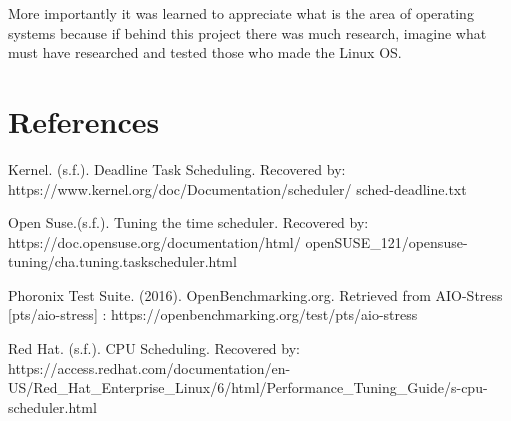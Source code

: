 \documentclass[a4paper]{article}
\begin{document}
More importantly it was learned to appreciate what is the area of operating systems because if behind this project there was much research, imagine what must have researched and tested those who made the Linux OS.

\section {References}

	Kernel. (s.f.). Deadline Task Scheduling. Recovered by: https://www.kernel.org/doc/Documentation/scheduler/
    sched-deadline.txt

\setlength{\parskip}{3mm}

Open Suse.(s.f.). Tuning the time scheduler. Recovered by: https://doc.opensuse.org/documentation/html/
openSUSE\_121/opensuse-tuning/cha.tuning.taskscheduler.html

Phoronix Test Suite. (2016). OpenBenchmarking.org. Retrieved from AIO-Stress [pts/aio-stress] : https://openbenchmarking.org/test/pts/aio-stress

Red Hat. (s.f.). CPU Scheduling. Recovered by: https://access.redhat.com/documentation/en-US/Red\_Hat\_Enterprise\_Linux/6/html/Performance\_Tuning\_Guide/s-cpu-scheduler.html
\end{document}

